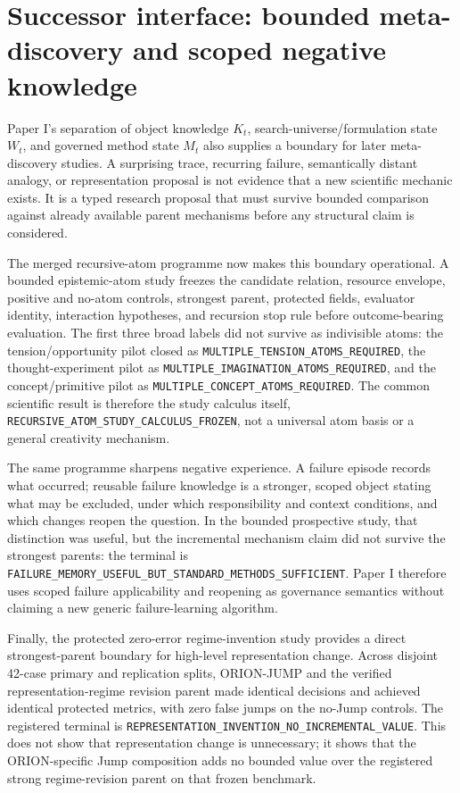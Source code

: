 \section{Successor interface: bounded meta-discovery and scoped negative knowledge}
\label{sec:p1-successor-discovery-failure}

Paper I's separation of object knowledge $K_t$, search-universe/formulation state $W_t$, and governed method state $M_t$ also supplies a boundary for later meta-discovery studies. A surprising trace, recurring failure, semantically distant analogy, or representation proposal is not evidence that a new scientific mechanic exists. It is a typed research proposal that must survive bounded comparison against already available parent mechanisms before any structural claim is considered.

The merged recursive-atom programme now makes this boundary operational. A bounded epistemic-atom study freezes the candidate relation, resource envelope, positive and no-atom controls, strongest parent, protected fields, evaluator identity, interaction hypotheses, and recursion stop rule before outcome-bearing evaluation. The first three broad labels did not survive as indivisible atoms: the tension/opportunity pilot closed as \texttt{MULTIPLE\_TENSION\_ATOMS\_REQUIRED}, the thought-experiment pilot as \texttt{MULTIPLE\_IMAGINATION\_ATOMS\_REQUIRED}, and the concept/primitive pilot as \texttt{MULTIPLE\_CONCEPT\_ATOMS\_REQUIRED}. The common scientific result is therefore the study calculus itself, \texttt{RECURSIVE\_ATOM\_STUDY\_CALCULUS\_FROZEN}, not a universal atom basis or a general creativity mechanism.

The same programme sharpens negative experience. A failure episode records what occurred; reusable failure knowledge is a stronger, scoped object stating what may be excluded, under which responsibility and context conditions, and which changes reopen the question. In the bounded prospective study, that distinction was useful, but the incremental mechanism claim did not survive the strongest parents: the terminal is \texttt{FAILURE\_MEMORY\_USEFUL\_BUT\_STANDARD\_METHODS\_SUFFICIENT}. Paper I therefore uses scoped failure applicability and reopening as governance semantics without claiming a new generic failure-learning algorithm.

Finally, the protected zero-error regime-invention study provides a direct strongest-parent boundary for high-level representation change. Across disjoint 42-case primary and replication splits, ORION-JUMP and the verified representation-regime revision parent made identical decisions and achieved identical protected metrics, with zero false jumps on the no-Jump controls. The registered terminal is \texttt{REPRESENTATION\_INVENTION\_NO\_INCREMENTAL\_VALUE}. This does not show that representation change is unnecessary; it shows that the ORION-specific Jump composition adds no bounded value over the registered strong regime-revision parent on that frozen benchmark.

